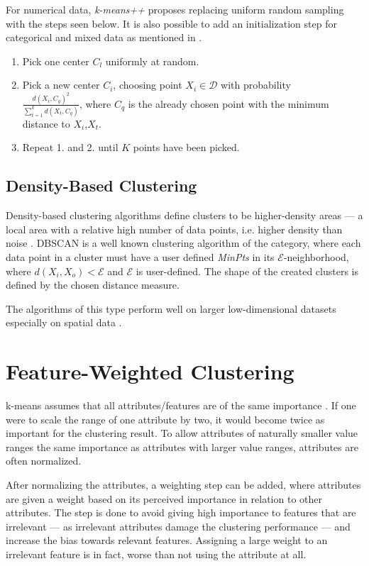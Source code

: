 \documentclass[../report.tex]{subfiles}
\begin{document}
For numerical data, \textit{k-means++} \cite{Arthur2006} proposes replacing uniform random sampling with the steps seen below. It is also possible to add an initialization step for categorical and mixed data as mentioned in \cite{Jia2018}.

\begin{enumerate}
\label{eq:plusplus}
  \item Pick one center $C_l$ uniformly at random.
  \item Pick a new center $C_i$, choosing point $X_i \in \mathcal{D}$ with probability \\ $\frac{d(X_i,C_q)^2}{\sum_{t=1}^{k}{d(X_t,C_q)}}$, where $C_q$ is the already chosen point with the minimum distance to $X_i$,$X_t$.
  \item Repeat 1. and 2. until $K$ points have been picked.
\end{enumerate}

\subsection{Density-Based Clustering}
\label{sub:density}
Density-based clustering algorithms define clusters to be higher-density areas --- a local area with a relative high number of data points, i.e. higher density than noise  \cite{Ester1996, huang2005automated, Xu2015,Jain1999}. DBSCAN \cite{Ester1996} is a well known clustering algorithm of the category, where each data point in a cluster must have a user defined \textit{MinPts} in its $\mathcal{E}$-neighborhood, where $d(X_i,X_o) < \mathcal{E}$ and $\mathcal{E}$ is user-defined. The shape of the created clusters is defined by the chosen distance measure.

The algorithms of this type perform well on larger low-dimensional datasets especially on spatial data \cite{Ester1996}.

\section{Feature-Weighted Clustering}
\label{ch:weighed}

k-means assumes that all attributes/features are of the same importance \cite{Kaufman1990}. If one were to scale the range of one attribute by two, it would become twice as important for the clustering result. To allow attributes of naturally smaller value ranges the same importance as attributes with larger value ranges, attributes are often normalized.

After normalizing the attributes, a weighting step can be added, where attributes are given a weight based on its perceived importance in relation to other attributes. The step is done to avoid giving high importance to features that are irrelevant --- as irrelevant attributes damage the clustering performance \cite{Kaufman1990} --- and increase the bias towards relevant features. Assigning a large weight to an irrelevant feature is in fact, worse than not using the attribute at all.
\end{document}
